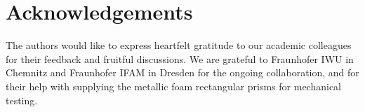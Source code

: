\documentclass[review]{elsarticle}
\begin{document}
{%







\printnomenclature[1.5cm]

\section*{Acknowledgements}

The authors would like to express heartfelt gratitude to our academic colleagues for their feedback and fruitful discussions. We are grateful to Fraunhofer IWU in Chemnitz and Fraunhofer IFAM in Dresden for the ongoing collaboration, and for their help with supplying the metallic foam rectangular prisms for mechanical testing.

}
\end{document}
